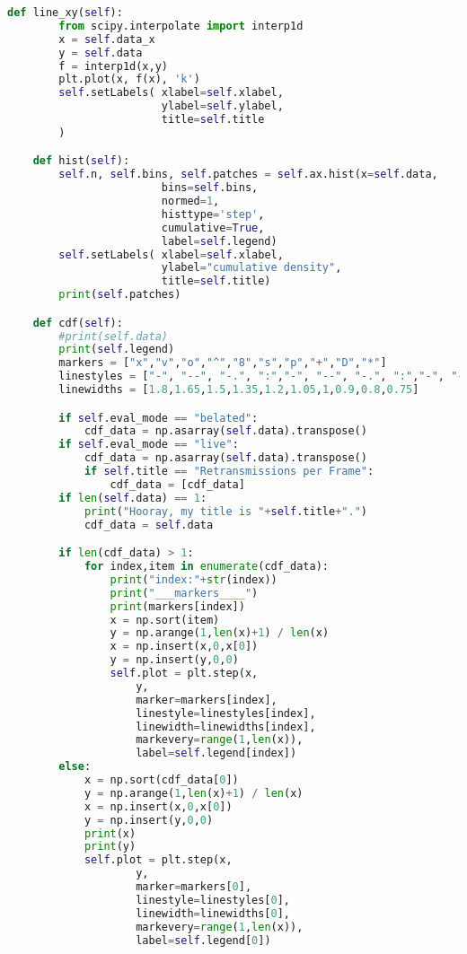 \begin{lstlisting}[language=Python,caption=myplot.py]
    def line_xy(self):
        from scipy.interpolate import interp1d
        x = self.data_x
        y = self.data
        f = interp1d(x,y)
        plt.plot(x, f(x), 'k')
        self.setLabels( xlabel=self.xlabel,
                        ylabel=self.ylabel,
                        title=self.title
        )

    def hist(self):
        self.n, self.bins, self.patches = self.ax.hist(x=self.data,
                        bins=self.bins,
                        normed=1,
                        histtype='step',
                        cumulative=True,
                        label=self.legend)
        self.setLabels( xlabel=self.xlabel,
                        ylabel="cumulative density",
                        title=self.title)
        print(self.patches)

    def cdf(self):
        #print(self.data)
        print(self.legend)
        markers = ["x","v","o","^","8","s","p","+","D","*"]
        linestyles = ["-", "--", "-.", ":","-", "--", "-.", ":","-", "--"]
        linewidths = [1.8,1.65,1.5,1.35,1.2,1.05,1,0.9,0.8,0.75]

        if self.eval_mode == "belated":
            cdf_data = np.asarray(self.data).transpose()
        if self.eval_mode == "live":
            cdf_data = np.asarray(self.data).transpose()
            if self.title == "Retransmissions per Frame":
                cdf_data = [cdf_data]
        if len(self.data) == 1:
            print("Hooray, my title is "+self.title+".")
            cdf_data = self.data

        if len(cdf_data) > 1:
            for index,item in enumerate(cdf_data):
                print("index:"+str(index))
                print("___markers____")
                print(markers[index])
                x = np.sort(item)
                y = np.arange(1,len(x)+1) / len(x)
                x = np.insert(x,0,x[0])
                y = np.insert(y,0,0)
                self.plot = plt.step(x,
                    y,
                    marker=markers[index],
                    linestyle=linestyles[index],
                    linewidth=linewidths[index],
                    markevery=range(1,len(x)),
                    label=self.legend[index])
        else:
            x = np.sort(cdf_data[0])
            y = np.arange(1,len(x)+1) / len(x)
            x = np.insert(x,0,x[0])
            y = np.insert(y,0,0)
            print(x)
            print(y)
            self.plot = plt.step(x,
                    y,
                    marker=markers[0],
                    linestyle=linestyles[0],
                    linewidth=linewidths[0],
                    markevery=range(1,len(x)),
                    label=self.legend[0])



\end{lstlisting}
